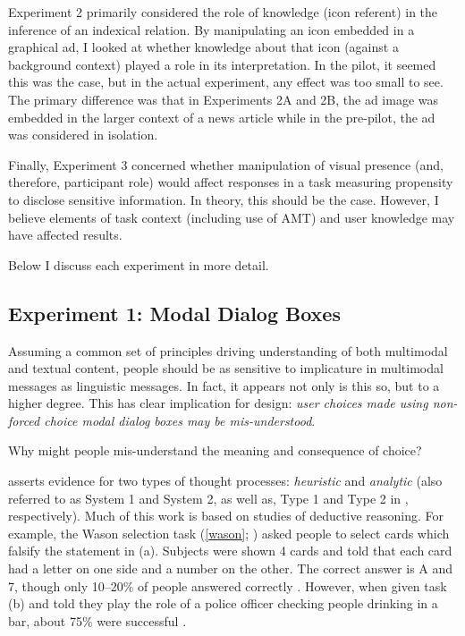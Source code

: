 Experiment 2 primarily considered the role of knowledge (icon referent) in the inference of an indexical relation. By manipulating an icon embedded in a graphical ad, I looked at whether knowledge about that icon (against a background context) played a role in its interpretation. In the pilot, it seemed this was the case, but in the actual experiment, any effect was too small to see. The primary difference was that in Experiments 2A and 2B, the ad image was embedded in the larger context of a news article while in the pre-pilot, the ad was considered in isolation.

Finally, Experiment 3 concerned whether manipulation of visual presence (and, therefore, participant role) would affect responses in a task measuring propensity to disclose sensitive information. In theory, this should be the case. However, I believe elements of task context (including use of AMT) and user knowledge may have affected results.

Below I discuss each experiment in more detail.

\subsection{Experiment 1: Modal Dialog Boxes}
\label{experiment1:modaldialogboxes}

Assuming a common set of principles driving understanding of both multimodal and textual content, people should be as sensitive to implicature in multimodal messages as linguistic messages. In fact, it appears not only is this so, but to a higher degree. This has clear implication for design: \emph{user choices made using non-forced choice modal dialog boxes may be mis-understood}.

Why might people mis-understand the meaning and consequence of choice?

 \citet{Evans:2003gp}  asserts evidence for two types of thought processes: \emph{heuristic} and \emph{analytic} (also referred to as System 1 and System 2, as well as, Type 1 and Type 2 in  \citealp{Kahneman:2011tc,Manktelow:2012tx}, respectively).  Much of this work is based on studies of deductive reasoning. For example, the Wason selection task  (\autoref{wason}; \citealp{Wason:1960wt})  asked people to select cards which falsify the statement in (a). Subjects were shown 4 cards and told that each card had a letter on one side and a number on the other. The correct answer is A and 7, though only 10--20\% of people answered correctly  \citep{Wason:1960wt}.  However, when given task (b) and told they play the role of a police officer checking people drinking in a bar, about 75\% were successful  \citep{griggs1982elusive}.  

